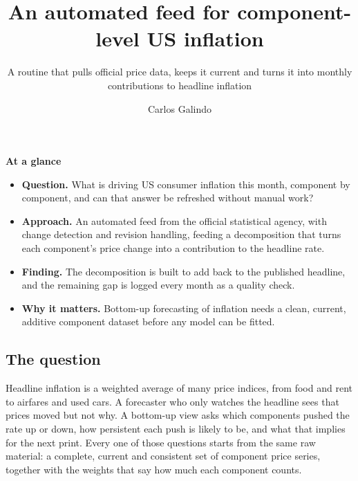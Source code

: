 \documentclass[
  british,
  a4paper,
]{article}
\title{An automated feed for component-level US inflation}
\subtitle{A routine that pulls official price data, keeps it current and
turns it into monthly contributions to headline inflation}
\author{Carlos Galindo}
\date{}
\providecommand{\tightlist}{%
  \setlength{\itemsep}{0pt}\setlength{\parskip}{0pt}}
\begin{document}
\maketitle


\begin{tcolorbox}[enhanced jigsaw, arc=.35mm, bottomrule=.15mm, breakable, colback=white, colframe=quarto-callout-note-color-frame, left=2mm, leftrule=.75mm, opacityback=0, rightrule=.15mm, toprule=.15mm]

\vspace{-3mm}\textbf{At a glance}\vspace{3mm}

\begin{itemize}
\tightlist
\item
  \textbf{Question.} What is driving US consumer inflation this month,
  component by component, and can that answer be refreshed without
  manual work?
\item
  \textbf{Approach.} An automated feed from the official statistical
  agency, with change detection and revision handling, feeding a
  decomposition that turns each component's price change into a
  contribution to the headline rate.
\item
  \textbf{Finding.} The decomposition is built to add back to the
  published headline, and the remaining gap is logged every month as a
  quality check.
\item
  \textbf{Why it matters.} Bottom-up forecasting of inflation needs a
  clean, current, additive component dataset before any model can be
  fitted.
\end{itemize}

\end{tcolorbox}

\subsection{The question}\label{the-question}

Headline inflation is a weighted average of many price indices, from
food and rent to airfares and used cars. A forecaster who only watches
the headline sees that prices moved but not why. A bottom-up view asks
which components pushed the rate up or down, how persistent each push is
likely to be, and what that implies for the next print. Every one of
those questions starts from the same raw material: a complete, current
and consistent set of component price series, together with the weights
that say how much each component counts.
\end{document}
